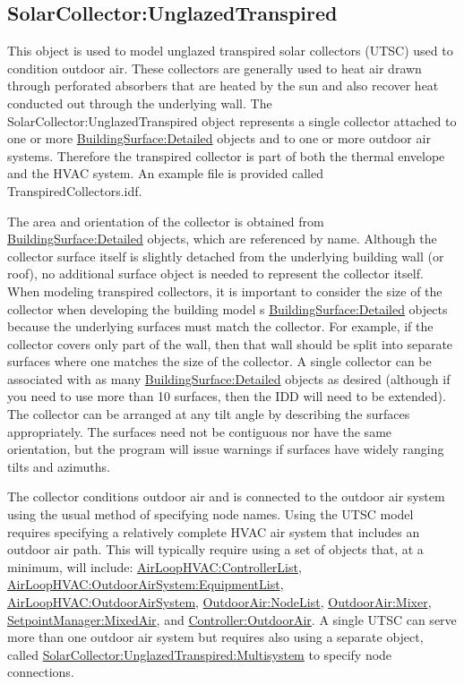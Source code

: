 \subsection{SolarCollector:UnglazedTranspired}\label{solarcollectorunglazedtranspired}

This object is used to model unglazed transpired solar collectors (UTSC) used to condition outdoor air. These collectors are generally used to heat air drawn through perforated absorbers that are heated by the sun and also recover heat conducted out through the underlying wall. The SolarCollector:UnglazedTranspired object represents a single collector attached to one or more \hyperref[buildingsurfacedetailed]{BuildingSurface:Detailed} objects and to one or more outdoor air systems. Therefore the transpired collector is part of both the thermal envelope and the HVAC system. An example file is provided called TranspiredCollectors.idf.

The area and orientation of the collector is obtained from \hyperref[buildingsurfacedetailed]{BuildingSurface:Detailed} objects, which are referenced by name. Although the collector surface itself is slightly detached from the underlying building wall (or roof), no additional surface object is needed to represent the collector itself. When modeling transpired collectors, it is important to consider the size of the collector when developing the building model s \hyperref[buildingsurfacedetailed]{BuildingSurface:Detailed} objects because the underlying surfaces must match the collector. For example, if the collector covers only part of the wall, then that wall should be split into separate surfaces where one matches the size of the collector. A single collector can be associated with as many \hyperref[buildingsurfacedetailed]{BuildingSurface:Detailed} objects as desired (although if you need to use more than 10 surfaces, then the IDD will need to be extended). The collector can be arranged at any tilt angle by describing the surfaces appropriately. The surfaces need not be contiguous nor have the same orientation, but the program will issue warnings if surfaces have widely ranging tilts and azimuths.

The collector conditions outdoor air and is connected to the outdoor air system using the usual method of specifying node names. Using the UTSC model requires specifying a relatively complete HVAC air system that includes an outdoor air path. This will typically require using a set of objects that, at a minimum, will include: \hyperref[airloophvaccontrollerlist]{AirLoopHVAC:ControllerList}, \hyperref[airloophvacoutdoorairsystemequipmentlist]{AirLoopHVAC:OutdoorAirSystem:EquipmentList}, \hyperref[airloophvacoutdoorairsystem]{AirLoopHVAC:OutdoorAirSystem}, \hyperref[outdoorairnodelist]{\hyperref[outdoorairnode]{OutdoorAir:Node}List}, \hyperref[outdoorairmixer]{OutdoorAir:Mixer}, \hyperref[setpointmanagermixedair]{SetpointManager:MixedAir}, and \hyperref[controlleroutdoorair]{Controller:OutdoorAir}. A single UTSC can serve more than one outdoor air system but requires also using a separate object, called \hyperref[solarcollectorunglazedtranspiredmultisystem]{SolarCollector:UnglazedTranspired:Multisystem} to specify node connections.

